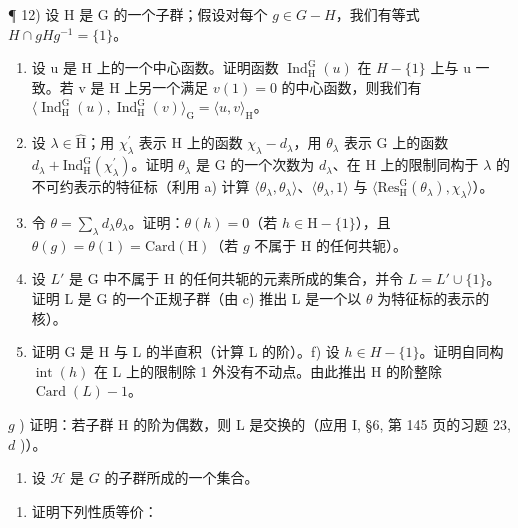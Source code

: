 ¶ 12) 设 H 是 G 的一个子群；假设对每个 \(g \in G - H\)，我们有等式 \(H \cap gHg^{-1} = \{1\}\)。

\begin{enumerate}
\def\labelenumi{\alph{enumi})}
\item
  设 u 是 H 上的一个中心函数。证明函数 \(\operatorname{Ind}_{\mathrm{H}}^{\mathrm{G}}(u)\) 在 \(H - \{1\}\) 上与 u 一致。若 v 是 H 上另一个满足 \(v(1) = 0\) 的中心函数，则我们有 \(\langle \operatorname{Ind}_{\mathrm{H}}^{\mathrm{G}}(u), \operatorname{Ind}_{\mathrm{H}}^{\mathrm{G}}(v) \rangle_{\mathrm{G}} = \langle u, v \rangle_{\mathrm{H}}\)。
\item
  设 \(\lambda \in \widehat{\mathrm{H}}\)；用 \(\chi_{\lambda}^{\prime}\) 表示 H 上的函数 \(\chi_{\lambda} - d_{\lambda}\)，用 \(\theta_{\lambda}\) 表示 G 上的函数 \(d_{\lambda} + \mathrm{Ind}_{\mathrm{H}}^{\mathrm{G}}(\chi_{\lambda}^{\prime})\)。证明 \(\theta_{\lambda}\) 是 G 的一个次数为 \(d_{\lambda}\)、在 H 上的限制同构于 \(\lambda\) 的不可约表示的特征标（利用 a) 计算 \(\langle\theta_{\lambda},\theta_{\lambda}\rangle\)、\(\langle\theta_{\lambda},1\rangle\) 与 \(\langle\mathrm{Res}_{\mathrm{H}}^{\mathrm{G}}(\theta_{\lambda}),\chi_{\lambda}\rangle\)）。
\item
  令 \(\theta = \sum_{\lambda} d_{\lambda} \theta_{\lambda}\)。证明：\(\theta(h) = 0\)（若 \(h \in \mathrm{H} - \{1\}\)），且 \(\theta(g) = \theta(1) = \mathrm{Card}(\mathrm{H})\)（若 \(g\) 不属于 \(\mathrm{H}\) 的任何共轭）。
\item
  设 \(L'\) 是 G 中不属于 H 的任何共轭的元素所成的集合，并令 \(L = L' \cup \{1\}\)。证明 L 是 G 的一个正规子群（由 c) 推出 L 是一个以 \(\theta\) 为特征标的表示的核）。
\item
  证明 G 是 H 与 L 的半直积（计算 L 的阶）。f) 设 \(h \in H - \{1\}\)。证明自同构 \(\operatorname{int}(h)\) 在 L 上的限制除 1 外没有不动点。由此推出 H 的阶整除 \(\operatorname{Card}(L) - 1\)。
\end{enumerate}

\(g\) ) 证明：若子群 H 的阶为偶数，则 L 是交换的（应用 I, §6, 第 145 页的习题 23, \(d\) )）。

\begin{enumerate}
\def\labelenumi{\arabic{enumi})}
\setcounter{enumi}{12}
\tightlist
\item
  设 \(\mathcal{H}\) 是 \(G\) 的子群所成的一个集合。
\end{enumerate}

\begin{enumerate}
\def\labelenumi{\alph{enumi})}
\tightlist
\item
  证明下列性质等价：
\end{enumerate}

